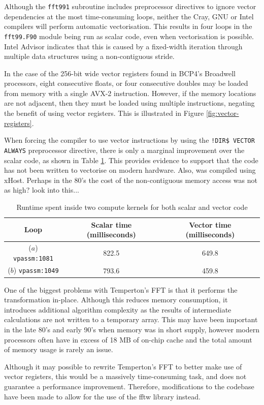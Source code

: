 \documentclass[a4paper,11pt]{report}
\begin{document}
Although the \texttt{fft991} subroutine includes preprocessor directives to ignore vector dependencies at the most time-consuming loops, neither the Cray, GNU or Intel compilers will perform automatic vectorisation. This results in four loops in the \texttt{fft99.F90} module being run as scalar code, even when vectorisation is possible. Intel Advisor indicates that this is caused by a fixed-width iteration through multiple data structures using a non-contiguous stride.
\par
In the case of the 256-bit wide vector registers found in BCP4's Broadwell processors, eight consecutive floats, or four consecutive doubles may be loaded from memory with a single AVX-2 instruction. However, if the memory locations are not adjacent, then they must be loaded using multiple instructions, negating the benefit of using vector registers. This is illustrated in Figure \ref{fig:vector-registers}. 
\par
When forcing the compiler to use vector instructions by using the \texttt{!DIR\$ VECTOR ALWAYS} preprocessor directive, there is only a marginal improvement over the scalar code, as shown in Table \ref{tbl:force-vec}. This provides evidence to support that the code has not been written to vectorise on modern hardware. Also, was compiled using xHost. Perhaps in the 80's the cost of the non-contiguous memory access was not as high? look into this...

\begin{table}[htp]
\caption{Runtime spent inside two compute kernels for both scalar and vector code}
\begin{center}
\begin{tabular}{ c c c }
\toprule 		
Loop						&	Scalar time (milliseconds)	&	Vector time (milliseconds)	\\ 
\midrule
($a$) \texttt{vpassm:1081}		&	822.5				&	649.8				\\
($b$) \texttt{vpassm:1049}		&	793.6				&	459.8				\\
\bottomrule

\end{tabular}
\end{center}
\label{tbl:force-vec}
\end{table}

One of the biggest problems with Temperton's FFT is that it performs the transformation in-place. Although this reduces memory consumption, it introduces additional algorithm complexity as the results of intermediate calculations are not written to a temporary array. This may have been important in the late 80's and early 90's when memory was in short supply, however modern processors often have in excess of 18 MB of on-chip cache and the total amount of memory usage is rarely an issue. 
\par
Although it may possible to rewrite Temperton's FFT to better make use of vector registers, this would be a massively time-consuming task, and does not guarantee a performance improvement. Therefore, modifications to the codebase have been made to allow for the use of the \gls{fftw} library instead.
\end{document}

